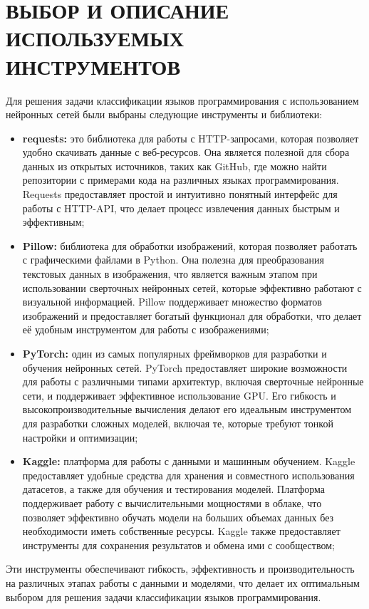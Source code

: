 {\newpage
\section{\MakeUppercase{Выбор и описание используемых инструментов}}
{
    Для решения задачи классификации языков программирования с использованием нейронных сетей были выбраны следующие инструменты и библиотеки: 
    \begin{itemize}
        \item \textbf{requests:} это библиотека для работы с HTTP-запросами, которая позволяет удобно скачивать данные с веб-ресурсов. Она является полезной для сбора данных из открытых источников, таких как GitHub, где можно найти репозитории с примерами кода на различных языках программирования. Requests предоставляет простой и интуитивно понятный интерфейс для работы с HTTP-API, что делает процесс извлечения данных быстрым и эффективным;
        \item \textbf{Pillow:} библиотека для обработки изображений, которая позволяет работать с графическими файлами в Python. Она полезна для преобразования текстовых данных в изображения, что является важным этапом при использовании сверточных нейронных сетей, которые эффективно работают с визуальной информацией. Pillow поддерживает множество форматов изображений и предоставляет богатый функционал для обработки, что делает её удобным инструментом для работы с изображениями;
        \item \textbf{PyTorch:} один из самых популярных фреймворков для разработки и обучения нейронных сетей. PyTorch предоставляет широкие возможности для работы с различными типами архитектур, включая сверточные нейронные сети, и поддерживает эффективное использование GPU. Его гибкость и высокопроизводительные вычисления делают его идеальным инструментом для разработки сложных моделей, включая те, которые требуют тонкой настройки и оптимизации;
        \item \textbf{Kaggle:} платформа для работы с данными и машинным обучением. Kaggle предоставляет удобные средства для хранения и совместного использования датасетов, а также для обучения и тестирования моделей. Платформа поддерживает работу с вычислительными мощностями в облаке, что позволяет эффективно обучать модели на больших объемах данных без необходимости иметь собственные ресурсы. Kaggle также предоставляет инструменты для сохранения результатов и обмена ими с сообществом;
    \end{itemize}
    Эти инструменты обеспечивают гибкость, эффективность и производительность на различных этапах работы с данными и моделями, что делает их оптимальным выбором для решения задачи классификации языков программирования. 
}

}
